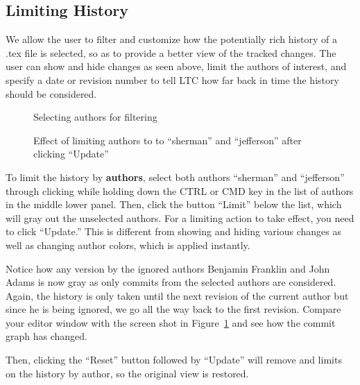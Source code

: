 \subsection{Limiting History} \label{sec:svn-limit-history}

We allow the user to filter and customize how the potentially rich history of a .tex file is selected, so as to provide a better view of the tracked changes.  The user can show and hide changes as seen above, limit the authors of interest, and specify a date or revision number to tell LTC how far back in time the history should be considered.

\begin{figure}
\centering
  \begin{minipage}[t]{0.35\linewidth}
  \centering
  \caption{Selecting authors for filtering} \label{fig:svn-editor-select-authors}
  \end{minipage}%
\hspace{0.04\linewidth}%
  \begin{minipage}[t]{0.61\linewidth}
  \centering
  \caption[Effect of limiting authors]{Effect of limiting authors to to ``sherman'' and ``jefferson'' after clicking ``Update''} \label{fig:svn-editor-limit-authors}
  \end{minipage}  
\end{figure}
To limit the history by \textbf{authors}, select both authors ``sherman'' and ``jefferson'' through clicking while holding down the CTRL or CMD key in the list of authors in the middle lower panel.  Then, click the button ``Limit'' below the list, which will gray out the unselected authors.  For a limiting action to take effect, you need to click ``Update.''  This is different from showing and hiding various changes as well as changing author colors, which is applied instantly.

Notice how any version by the ignored authors Benjamin Franklin and John Adams is now gray as only commits from the selected authors are considered.  Again, the history is only taken until the next revision of the current author but since he is being ignored, we go all the way back to the first revision. Compare your editor window with the screen shot in Figure~\ref{fig:svn-editor-limit-authors} and see how the commit graph has changed.

Then, clicking the ``Reset'' button followed by ``Update'' will remove and limits on the history by author, so the original view is restored.

